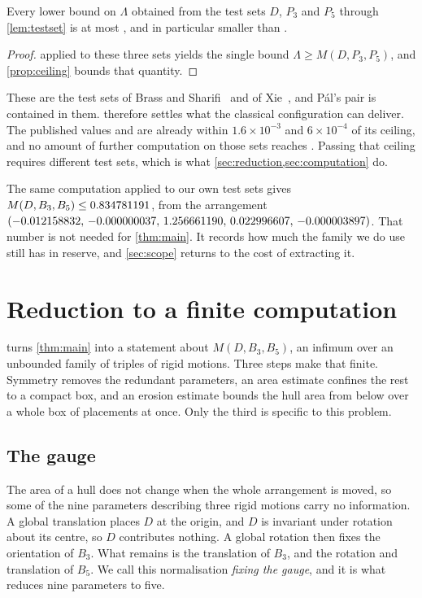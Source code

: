 \documentclass[a4paper,UKenglish,cleveref,autoref,thm-restate,numberwithinsect]{lipics-v2021}
\begin{document}
\begin{corollary}
\label{cor:exhausted}
Every lower bound on $\Lambda$ obtained from the test sets $D$, $P_3$ and $P_5$
through \cref{lem:testset} is at most \ClassicalCeilingSafe{}, and in particular
smaller than \MainBound{}.
\end{corollary}

\begin{proof}
 applied to these three sets yields the single bound
$\Lambda\ge M(D,P_3,P_5)$, and \cref{prop:ceiling} bounds that quantity.
\end{proof}

These are the test sets of Brass and Sharifi~\cite{BrassSharifi2005} and of
Xie~\cite{Xie2026}, and P\'al's pair is contained in them.
 therefore settles what the classical configuration can
deliver. The published values \BSLB{} and \XieLB{} are already within
$1.6\times10^{-3}$ and $6\times10^{-4}$ of its ceiling, and no amount of further
computation on those sets reaches \MainBound{}. Passing that ceiling requires
different test sets, which is what \cref{sec:reduction,sec:computation} do.

The same computation applied to our own test sets gives
$M(D,B_3,B_5)\le0.834781191$, from the arrangement
$(-0.012158832,\,-0.000000037,\,1.256661190,\,0.022996607,\,-0.000003897)$. That number is not needed for \cref{thm:main}. It records how
much the family we do use still has in reserve, and \cref{sec:scope} returns to
the cost of extracting it.

\section{Reduction to a finite computation}
\label{sec:reduction}

 turns \cref{thm:main} into a statement about
$M(D,B_3,B_5)$, an infimum over an unbounded family of triples of rigid motions.
Three steps make that finite. Symmetry removes the redundant parameters, an area
estimate confines the rest to a compact box, and an erosion estimate bounds the
hull area from below over a whole box of placements at once. Only the third is
specific to this problem.

\subsection{The gauge}

The area of a hull does not change when the whole arrangement is moved, so some
of the nine parameters describing three rigid motions carry no information. A
global translation places $D$ at the origin, and $D$ is invariant under rotation
about its centre, so $D$ contributes nothing. A global rotation then fixes the
orientation of $B_3$. What remains is the translation of $B_3$, and the rotation
and translation of $B_5$. We call this normalisation \emph{fixing the gauge},
and it is what reduces nine parameters to five.
\end{document}
